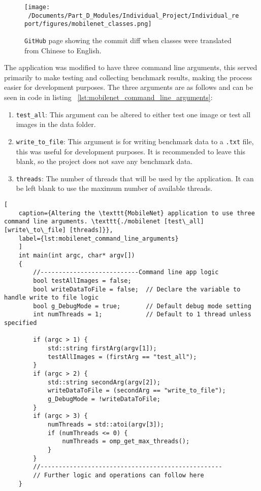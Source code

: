 \begin{figure}[H] %
	\centering
	\texttt{[image: ~/Documents/Part\_D\_Modules/Individual\_Project/Individual\_report/figures/mobilenet\_classes.png]} %
	\caption{\texttt{GitHub} page showing the commit diff when classes were translated from Chinese to English. }
	\label{fig:mobilenet_classes} %
\end{figure}

The application was modified to have three command line arguments, this served primarily to make testing and collecting benchmark results, making the process easier for development purposes. The three arguments are as follows and can be seen in code in listing ~\ref{lst:mobilenet_command_line_arguments}:

\begin{enumerate}
	\item \texttt{test\_all}: This argument can be altered to either test one image or test all images in the data folder.  
	\item \texttt{write\_to\_file}: This argument is for writing benchmark data to a \texttt{.txt} file, this was useful for development purposes. It is recommended to leave this blank, so the project does not save any benchmark data. 
	\item \texttt{threads}: The number of threads that will be used by the application. It can be left blank to use the maximum number of available threads.  
\end{enumerate}

\begin{lstlisting}[
	caption={Altering the \texttt{MobileNet} application to use three command line arguments. \texttt{./mobilenet [test\_all] [write\_to\_file] [threads]}},
	label={lst:mobilenet_command_line_arguments}
	]
	int main(int argc, char* argv[])
	{
		//---------------------------Command line app logic
		bool testAllImages = false;
		bool writeDataToFile = false;  // Declare the variable to handle write to file logic
		bool g_DebugMode = true;       // Default debug mode setting
		int numThreads = 1;            // Default to 1 thread unless specified
		
		if (argc > 1) {
			std::string firstArg(argv[1]);
			testAllImages = (firstArg == "test_all");
		}
		if (argc > 2) {
			std::string secondArg(argv[2]);
			writeDataToFile = (secondArg == "write_to_file");
			g_DebugMode = !writeDataToFile; 
		}
		if (argc > 3) {
			numThreads = std::atoi(argv[3]);
			if (numThreads <= 0) {
				numThreads = omp_get_max_threads();  
			}
		}
		//--------------------------------------------------
		// Further logic and operations can follow here
	}
\end{lstlisting}


